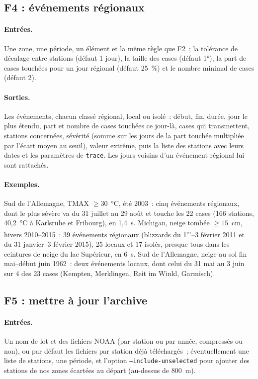 \subsection{F4 : événements régionaux}
\paragraph{Entrées.} Une zone, une période, un élément et la même règle que F2~; la tolérance de décalage entre stations (défaut 1 jour), la taille des cases (défaut 1°), la part de cases touchées pour un jour régional (défaut 25~\%) et le nombre minimal de cases (défaut 2).
\paragraph{Sorties.} Les événements, chacun classé régional, local ou isolé~: début, fin, durée, jour le plus étendu, part et nombre de cases touchées ce jour-là, cases qui transmettent, stations concernées, sévérité (somme sur les jours de la part touchée multipliée par l'écart moyen au seuil), valeur extrême, puis la liste des stations avec leurs dates et les paramètres de \texttt{trace}. Les jours voisins d'un événement régional lui sont rattachés.
\paragraph{Exemples.} Sud de l'Allemagne, TMAX $\geq 30$~°C, été 2003~: cinq événements régionaux, dont le plus sévère va du 31 juillet au 29 août et touche les 22 cases (166 stations, 40,2~°C à Karlsruhe et Fribourg), en 1,4~s. Michigan, neige tombée $\geq 15$~cm, hivers 2010--2015~: 39 événements régionaux (blizzards du 1\textsuperscript{er}--3 février 2011 et du 31 janvier--3 février 2015), 25 locaux et 17 isolés, presque tous dans les ceintures de neige du lac Supérieur, en 6~s. Sud de l'Allemagne, neige au sol fin mai--début juin 1962~: deux événements locaux, dont celui du 31 mai au 3 juin sur 4 des 23 cases (Kempten, Merklingen, Reit im Winkl, Garmisch).

\subsection{F5 : mettre à jour l'archive}
\paragraph{Entrées.} Un nom de lot et des fichiers NOAA (par station ou par année, compressés ou non), ou par défaut les fichiers par station déjà téléchargés~; éventuellement une liste de stations, une période, et l'option \texttt{--include-unselected} pour ajouter des stations de nos zones écartées au départ (au-dessus de 800~m).
